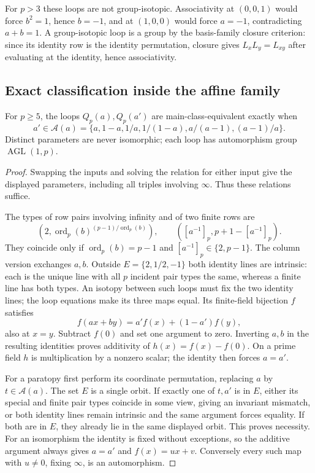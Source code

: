 For $p>3$ these loops are not group-isotopic. Associativity at
$(0,0,1)$ would force $b^2=1$, hence $b=-1$, and at $(1,0,0)$
would force $a=-1$, contradicting $a+b=1$. A group-isotopic loop
is a group by the basis-family closure criterion: since its identity
row is the identity permutation, closure gives $L_xL_y=L_{xy}$
after evaluating at the identity, hence associativity.

\subsection{Exact classification inside the affine family}

\begin{theorem}
\label{thm:affine-anharmonic}
For $p\geq5$, the loops $Q_p(a),Q_p(a')$ are main-class-equivalent
exactly when
\[
 a'\in\mathcal A(a)=
 \{a,1-a,1/a,1/(1-a),a/(a-1),(a-1)/a\}.
\]
Distinct parameters are never isomorphic; each loop has automorphism
group $\operatorname{AGL}(1,p)$.
\end{theorem}

\begin{proof}
Swapping the inputs and solving the relation for either input give
the displayed parameters, including all triples involving
$\infty$. Thus these relations suffice.

The types of row pairs involving infinity and of two finite rows are
\[
 (2,\operatorname{ord}_p(b)^{(p-1)/\operatorname{ord}_p(b)}),
 \qquad([a^{-1}]_p,p+1-[a^{-1}]_p).
\]
They coincide only if $\operatorname{ord}_p(b)=p-1$ and
$[a^{-1}]_p\in\{2,p-1\}$. The column version exchanges $a,b$.
Outside $E=\{2,1/2,-1\}$ both identity lines are intrinsic:
each is the unique line with all $p$ incident pair types the
same, whereas a finite line has both types. An isotopy between
such loops must fix the two identity lines; the loop equations
make its three maps equal. Its finite-field bijection $f$ satisfies
\[
 f(ax+by)=a'f(x)+(1-a')f(y),
\]
also at $x=y$. Subtract $f(0)$ and set one argument to zero.
Inverting $a,b$ in the resulting identities proves additivity of
$h(x)=f(x)-f(0)$. On a prime field $h$ is multiplication by a
nonzero scalar; the identity then forces $a=a'$.

For a paratopy first perform its coordinate permutation, replacing
$a$ by $t\in\mathcal A(a)$. The set $E$ is a single orbit.
If exactly one of $t,a'$ is in $E$, either its special and finite
pair types coincide in some view, giving an invariant mismatch,
or both identity lines remain intrinsic and the same argument
forces equality. If both are in $E$, they already lie in the
same displayed orbit. This proves necessity.
For an isomorphism the identity is fixed without exceptions,
so the additive argument always gives $a=a'$ and $f(x)=ux+v$.
Conversely every such map with $u\ne0$, fixing $\infty$, is
an automorphism.
\end{proof}

